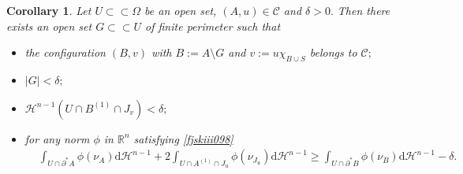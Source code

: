 \documentclass[reqno]{amsart}
\numberwithin{equation}{section}
\theoremstyle{plain}
\newtheorem{corollary}[theorem]{Corollary}
\theoremstyle{definition}
\newcommand{\R}{\mathbb{R}}
\newcommand{\cH}{\mathcal{H}}
\newcommand{\p}{\partial}
\renewcommand{\d}{\mathrm{d}}
\newcommand{\strictlyincluded}{\subset\subset}
\newcommand{\admissible}{\mathcal{C}}
\begin{document}
\begin{corollary}\label{cor:functions_with_good_cracks}
Let $U\strictlyincluded \Omega$ be an open set, $(A,u)\in\admissible$ and $\delta>0.$ Then there exists an open set $G\strictlyincluded U$ of finite perimeter such that  
\begin{itemize}[left=15pt]
 \item[\rm(i)] the configuration $(B,v)$ with $B:=A\setminus G$ and $v:=u\chi_{B\cup S}$ belongs to $\admissible;$ 
  
 \item[\rm(ii)] $|G|<\delta;$

 \item[\rm(iii)] $\cH^{n-1}(U\cap B^{(1)} \cap J_v)<\delta;$
 
 \item[\rm(iv)] for any norm $\phi$ in $\R^n$ satisfying \eqref{fjskiii098}
 \begin{align*}
 & \int_{U\cap\p^*A} \phi(\nu_A)\d\cH^{n-1} +  
 2\int_{U\cap A^{(1)}\cap J_u} \phi(\nu_{J_u})\d\cH^{n-1}\ge 
 \int_{U\cap\p^*B} \phi(\nu_B)\d\cH^{n-1} - \delta.  
 \end{align*}
\end{itemize}

\end{corollary}
\end{document}
